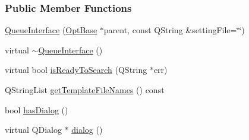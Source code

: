 \subsubsection*{Public Member Functions}
\begin{DoxyCompactItemize}
\item 
\hyperlink{classGlobalSearch_1_1QueueInterface_a77760aeacabb67669a1a32cf3355d472}{Queue\+Interface} (\hyperlink{classGlobalSearch_1_1OptBase}{Opt\+Base} $\ast$parent, const Q\+String \&setting\+File=\char`\"{}\char`\"{})
\item 
virtual \hyperlink{classGlobalSearch_1_1QueueInterface_a3e27228ce5719de17a5fabe8c105d174}{$\sim$\+Queue\+Interface} ()
\item 
virtual bool \hyperlink{classGlobalSearch_1_1QueueInterface_a5da91bc3cd0c30e9a3c7259aada7b5f9}{is\+Ready\+To\+Search} (Q\+String $\ast$err)
\item 
Q\+String\+List \hyperlink{classGlobalSearch_1_1QueueInterface_a1208dba4232727cc026efdf7423f29ad}{get\+Template\+File\+Names} () const 
\item 
bool \hyperlink{group__dialog_gaa78e95fa76777efba3cdfd70d8e3caf9}{has\+Dialog} ()
\item 
virtual Q\+Dialog $\ast$ \hyperlink{group__dialog_ga4457d66b93f0406af1b595659ca25dcf}{dialog} ()
\end{DoxyCompactItemize}
